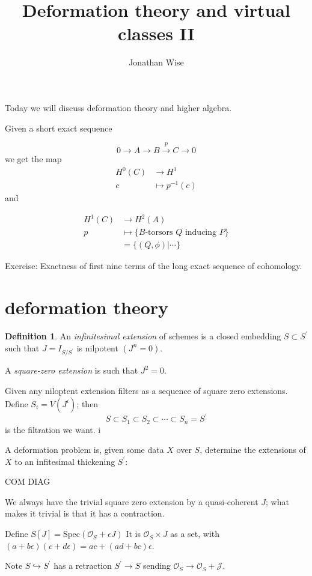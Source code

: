 \documentclass{amsart}
\author{Jonathan Wise}
\title{Deformation theory and virtual classes II}
\theoremstyle{definition}
\newtheorem{definition}[dummy]{Definition}
\newcommand{\OO}{\mathcal{O}}
\newcommand{\J}{\mathcal{J}}
\begin{document}
\maketitle

Today we will discuss deformation theory and higher algebra.

Given a short exact sequence

$$0\to A\to B \stackrel{p}\to C\to 0$$
we get the map 
\begin{align*}
H^0(C)&\to H^1 \\
c&\mapsto p^{-1}(c) 
\end{align*}
and

\begin{align*}
H^1(C)&\to H^2(A) \\
p&\mapsto \{\text{$B$-torsors $Q$ inducing $P$}\} \\
&=\{(Q,\phi)|\cdots\}
\end{align*}

Exercise: Exactness of first nine terms of the long exact sequence of cohomology.

\section{deformation theory}


\begin{definition}
An \emph{infinitesimal extension} of schemes is a closed embedding $S\subset S^\prime$ such that $J=I_{S/S^{\prime}}$ is nilpotent $(J^n=0)$.

A \emph{square-zero extension} is such that $J^2=0$.

\end{definition}


Given any niloptent extension filters as a sequence of square zero extensions.  
Define $S_i=V(J^i)$; then 
$$S\subset S_1\subset S_2\subset\cdots\subset S_n=S^\prime$$
is the filtration we want.
 i

A deformation problem is, given some data $X$ over $S$, determine the extensions of $X$ to an infitesimal thickening $S^\prime$:

COM DIAG

We always have the trivial square zero extension by a quasi-coherent $J$; what makes it trivial is that it has a contraction.

Define $S[J]=\text{Spec}(\OO_S+\epsilon J)$
It is $\OO_S\times J$ as a set, with $(a+b\epsilon)(c+d\epsilon)=ac+(ad+bc)\epsilon$.

Note $S\hookrightarrow S^\prime$ has a retraction $S^\prime\to S$ sending $\OO_S\to \OO_S+\J$.
\end{document}
